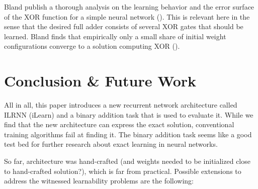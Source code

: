 \documentclass{article}
\begin{document}
Bland publish a thorough analysis on the learning behavior and the error surface of the XOR function for a simple neural network (\citeyear{trove.nla.gov.au/work/18037125}). This is relevant here in the sense that the desired full adder consists of several XOR gates that should be learned. Bland finds that empirically only a small share of initial weight configurations converge to a solution computing XOR (\citeyear{trove.nla.gov.au/work/18037125}).



\section{Conclusion \& Future Work}

All in all, this paper introduces a new recurrent network architecture called ILRNN (iLearn) and a binary addition task that is used to evaluate it. While we find that the new architecture can express the exact solution, conventional training algorithms fail at finding it. The binary addition task seems like a good test bed for further research about exact learning in neural networks.


So far, architecture was hand-crafted (and weights needed to be initialized close to hand-crafted solution?), which is far from practical. Possible extensions to address the witnessed learnability problems are the following:
\end{document}
